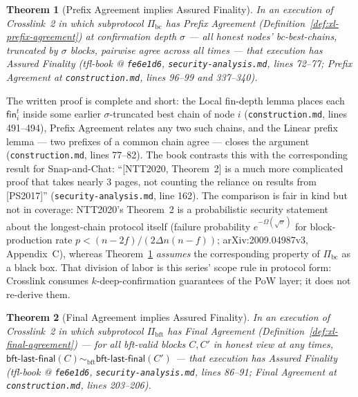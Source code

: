 \documentclass[11pt,a4paper]{article}
\newtheorem{theorem}{Theorem}[section]
\theoremstyle{definition}
\begin{document}
\begin{theorem}[Prefix Agreement implies Assured Finality]
\label{thm:xl-safety-prefix}
In an execution of Crosslink~2 in which subprotocol $\Pi_{\mathrm{bc}}$
has Prefix Agreement (Definition~\ref{def:xl-prefix-agreement}) at
confirmation depth $\sigma$ --- all honest nodes'
bc-best-chains, truncated by $\sigma$ blocks, pairwise agree across all
times --- that execution has Assured Finality (tfl-book @
\texttt{fe6e1d6}, \texttt{security-analysis.md}, lines 72--77;
Prefix Agreement at \texttt{construction.md}, lines 96--99 and 337--340).
\end{theorem}

The written proof is complete and short: the Local fin-depth lemma places
each $\mathsf{fin}_i^t$ inside some earlier $\sigma$-truncated best chain
of node $i$ (\texttt{construction.md}, lines 491--494), Prefix Agreement
relates any two such chains, and the Linear prefix lemma --- two prefixes
of a common chain agree --- closes the argument (\texttt{construction.md},
lines 77--82). The book contrasts this with the corresponding result for
Snap-and-Chat: ``[NTT2020, Theorem~2] is a much more complicated proof
that takes nearly 3 pages, not counting the reliance on results from
[PS2017]'' (\texttt{security-analysis.md}, line 162). The comparison is
fair in kind but not in coverage: NTT2020's Theorem~2 is a probabilistic
security statement about the longest-chain protocol itself (failure
probability $e^{-\Omega(\sqrt{\sigma})}$ for block-production rate
$p < (n-2f)/(2 \Delta n (n-f))$; arXiv:2009.04987v3, Appendix~C), whereas
Theorem~\ref{thm:xl-safety-prefix} \emph{assumes} the corresponding
property of $\Pi_{\mathrm{bc}}$ as a black box. That division of labor is
this series' scope rule in protocol form: Crosslink consumes
$k$-deep-confirmation guarantees of the PoW layer; it does not re-derive
them.

\begin{theorem}[Final Agreement implies Assured Finality]
\label{thm:xl-safety-final}
In an execution of Crosslink~2 in which subprotocol $\Pi_{\mathrm{bft}}$
has Final Agreement (Definition~\ref{def:xl-final-agreement}) --- for
all bft-valid blocks $C, C'$ in honest view at
any times, $\textsf{bft-last-final}(C) \sim_{\mathrm{bft}}
\textsf{bft-last-final}(C')$ --- that execution has Assured Finality
(tfl-book @ \texttt{fe6e1d6}, \texttt{security-analysis.md}, lines 86--91;
Final Agreement at \texttt{construction.md}, lines 203--206).
\end{theorem}
\end{document}
